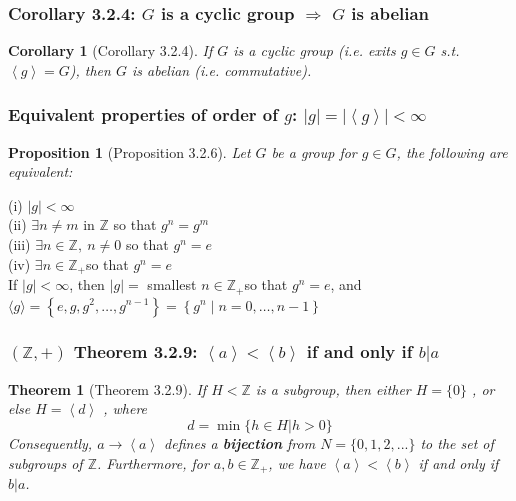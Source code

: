 \documentclass[11pt,a4paper]{article}
\newtheorem{theorem}{Theorem}
\newtheorem{proposition}{Proposition}
\newtheorem{corollary}{Corollary}
\begin{document}
\subsubsection{Corollary 3.2.4: $G$ is a cyclic group $\Rightarrow	$ $G$ is abelian}
\begin{corollary}[Corollary 3.2.4]
    If $G$ is a cyclic group (i.e. exits $g\in G$ s.t. $\left\langle g\right\rangle=G$), then $G$ is abelian (i.e. commutative).
\end{corollary}

\subsubsection{Equivalent properties of order of $g$: $|g|=|\left\langle g\right\rangle|<\infty$}
\begin{proposition}[Proposition 3.2.6]
    Let $G$ be a group for $g \in G$, the
    following are equivalent:
\end{proposition}
(i) $|g|<\infty$\\
(ii) $\exists n \neq m$ in $\mathbb{Z}$ so that $g^{n}=g^{m}$\\
(iii) $\exists n \in \mathbb{Z},\ n\neq 0$ so that $g^{n}=e$\\
(iv) $\exists n \in \mathbb{Z}_{+}$so that $g^{n}=e$\\
If $|g|<\infty$, then $|g|=$ smallest $n \in \mathbb{Z}_{+}$so that $g^{n}=e$, and $\langle g\rangle=\left\{e, g, g^{2}, \ldots, g^{n-1}\right\}=\left\{g^{n} \mid n=0, \ldots, n-1\right\}$

\subsubsection{$(\mathbb{Z},+)$ Theorem 3.2.9: $\left\langle a\right\rangle <\left\langle b\right\rangle$ if and only if $b|a$}
\begin{theorem}[Theorem 3.2.9]
    If $H < \mathbb{Z}$ is a subgroup, then either $H = \{ 0 \}$ , or else $H=\left\langle d\right\rangle$ , where $$d = \min \{ h \in H | h > 0 \}$$
    Consequently, $a \rightarrow \left\langle a\right\rangle$ deﬁnes a \textbf{bijection} from $N = \{ 0, 1, 2, . . . \}$ to the set of subgroups of $\mathbb{Z}$. Furthermore,
    for $a,b\in \mathbb{Z}_{+}$, we have $\left\langle a\right\rangle <\left\langle b\right\rangle$ if and only if $b|a$.
\end{theorem}
\end{document}
